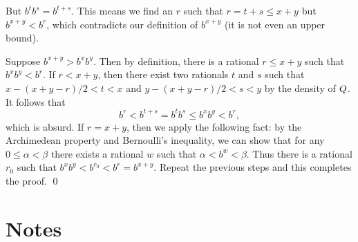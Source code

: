 \begin{enumerate}
\begin{enumerate}
    But \(b^t b^s = b^{t+s}\).  This means we find an \(r\) such that \(r = t + s \le x + y\) but \(b^{x+y} < b^r\), which contradicts our definition of \(b^{x+y}\) (it is not even an upper bound).

    Suppose \(b^{x+y} > b^x b^y\).  Then by definition, there is a rational \(r \le x + y\) such that \(b^x b^y < b^r\).  If \(r < x + y\), then there exist two rationals \(t\) and \(s\) such that \(x - (x+y-r)/2 < t < x\) and \(y - (x+y-r)/2 < s < y\) by the density of \(Q\).  It follows that
    \begin{equation*}
      b^r < b^{t+s} = b^t b^s \le b^x b^y < b^r,
    \end{equation*}
    which is absurd.  If \(r = x + y\), then we apply the following fact: by the Archimedean property and Bernoulli's inequality, we can show that for any \(0 \le α < β\) there exists a rational \(w\) such that \(α < b^w < β\).  Thus there is a rational \(r_0\) such that \(b^x b^y < b^{r_0} < b^r = b^{x+y}\).  Repeat the previous steps and this completes the proof.
    \qed
  \end{enumerate}
\end{enumerate}

\section{Notes}



